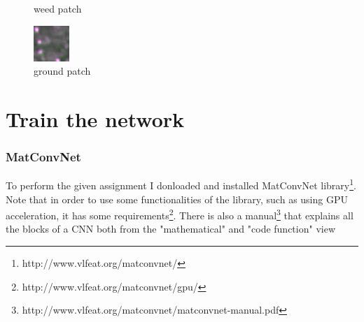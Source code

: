 \documentclass{beamer}
\begin{document}
\begin{frame}
\begin{figure}[!htb]
  \caption{weed patch}\label{fig:weed sample}
\endminipage\hfill
{}%
  \includegraphics[width=\linewidth]{ground.png}
  \caption{ground patch}\label{fig:ground sample}
\endminipage
\end{figure}


\end{frame}


\section{Train the network}

\begin{frame}
\frametitle{MatConvNet}

To perform the given assignment I donloaded and installed MatConvNet library\footnote{http://www.vlfeat.org/matconvnet/}. Note that in order to use some functionalities of the library, such as using GPU acceleration, it has some requirements\footnote{http://www.vlfeat.org/matconvnet/gpu/}.
There is also a manual\footnote{http://www.vlfeat.org/matconvnet/matconvnet-manual.pdf} that explains all the blocks of a CNN both from the "mathematical" and "code function" view

\end{frame}
\end{document}
